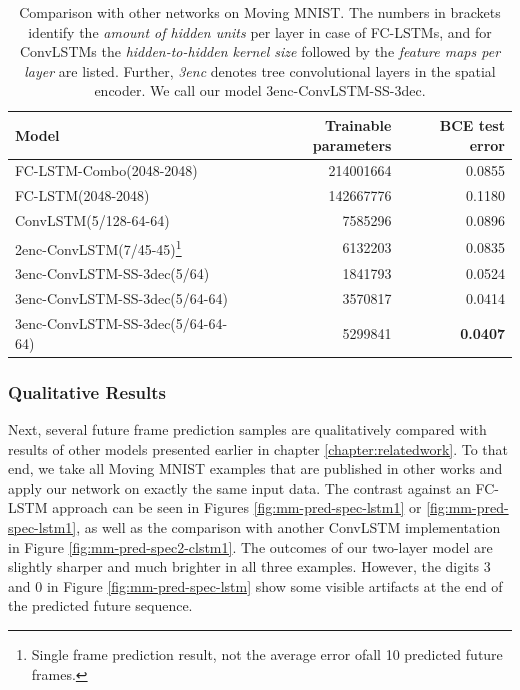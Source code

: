 \begin{table}[htb]
  \small
  \centering
  \begin{tabular}{l r r}
    \toprule
      \textbf{Model} & \textbf{Trainable parameters} & \textbf{BCE test error} \\
    \midrule
      FC-LSTM-Combo(2048-2048) \tiny{\parencite{unsup_learn_lstm}} & \num{214001664} & 0.0855 \\
      FC-LSTM(2048-2048) \tiny{\parencite{conv_lstm_nowcasting}} & \num{142667776} & 0.1180 \\
      ConvLSTM(5/128-64-64) \tiny{\parencite{conv_lstm_nowcasting}} & \num{7585296} & 0.0896 \\
      2enc-ConvLSTM(7/45-45)\footnote{Single frame prediction result, not the average error ofall 10 predicted future frames.} \tiny{\parencite{spat_temp_video_autoenc}} & \num{6132203} & 0.0835 \\
    \midrule
      3enc-ConvLSTM-SS-3dec(5/64) & \num{1841793} & 0.0524 \\
      3enc-ConvLSTM-SS-3dec(5/64-64) & \num{3570817} & 0.0414 \\
      3enc-ConvLSTM-SS-3dec(5/64-64-64) & \num{5299841} & \textbf{0.0407} \\
    \bottomrule
  \end{tabular}
  \caption[Test Results on Moving MNIST]{Comparison with other networks on Moving MNIST. The numbers in brackets identify the \textit{amount of hidden units} per layer in case of FC-LSTMs, and for ConvLSTMs the \textit{hidden-to-hidden kernel size} followed by the \textit{feature maps per layer} are listed. Further, \textit{3enc} denotes tree convolutional layers in the spatial encoder. We call our model 3enc-ConvLSTM-SS-3dec.}\label{tab:mm-comparison}
\end{table}

\subsubsection{Qualitative Results}

Next, several future frame prediction samples are qualitatively compared with results of other models presented earlier in chapter \ref{chapter:relatedwork}. To that end, we take all Moving MNIST examples that are published in other works and apply our network on exactly the same input data. The contrast against an FC-LSTM approach can be seen in Figures \ref{fig:mm-pred-spec-lstm1} or \ref{fig:mm-pred-spec-lstm1}, as well as the comparison with another ConvLSTM implementation in Figure \ref{fig:mm-pred-spec2-clstm1}. The outcomes of our two-layer model are slightly sharper and much brighter in all three examples. However, the digits \num{3} and \num{0} in Figure \ref{fig:mm-pred-spec-lstm} show some visible artifacts at the end of the predicted future sequence.

